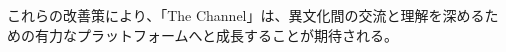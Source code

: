 \documentclass[b5paper,12pt,dvipdfmx]{jsreport}
\begin{document}
これらの改善策により、「The Channel」は、異文化間の交流と理解を深めるための有力なプラットフォームへと成長することが期待される。













\end{document}
